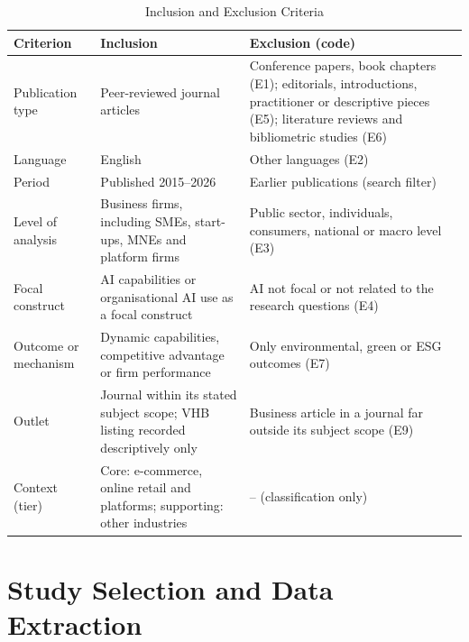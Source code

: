 \begin{table}[H]
  \centering
  \caption{Inclusion and Exclusion Criteria}
  \label{tab:criteria}
  \small{}
  \begin{tabularx}{\textwidth}{>{\raggedright\arraybackslash}p{2.6cm}>{\raggedright\arraybackslash}X>{\raggedright\arraybackslash}X}
    \toprule
    \textbf{Criterion} & \textbf{Inclusion} & \textbf{Exclusion (code)} \\
    \midrule
    Publication type & Peer-reviewed journal articles & Conference papers, book chapters (E1); editorials, introductions, practitioner or descriptive pieces (E5); literature reviews and bibliometric studies (E6) \\
    \addlinespace
    Language & English & Other languages (E2) \\
    \addlinespace
    Period & Published 2015--2026 & Earlier publications (search filter) \\
    \addlinespace
    Level of analysis & Business firms, including SMEs, start-ups, MNEs and platform firms & Public sector, individuals, consumers, national or macro level (E3) \\
    \addlinespace
    Focal construct & AI capabilities or organisational AI use as a focal construct & AI not focal or not related to the research questions (E4) \\
    \addlinespace
    Outcome or mechanism & Dynamic capabilities, competitive advantage or firm performance & Only environmental, green or ESG outcomes (E7) \\
    \addlinespace
    Outlet & Journal within its stated subject scope; VHB listing recorded descriptively only & Business article in a journal far outside its subject scope (E9) \\
    \addlinespace
    Context (tier) & Core: e-commerce, online retail and platforms; supporting: other industries & -- (classification only) \\
    \bottomrule
  \end{tabularx}
\end{table}

\section{Study Selection and Data Extraction}
\label{sec:selection}

